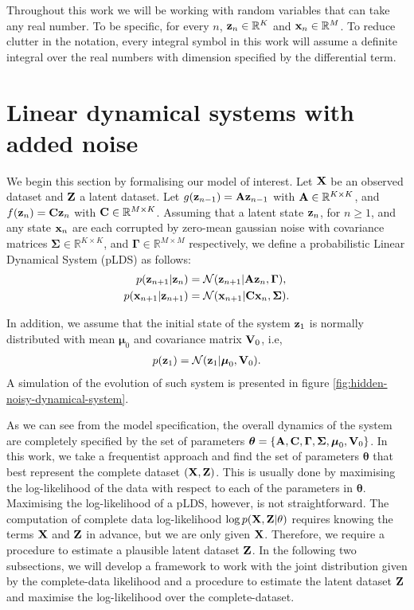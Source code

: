 \documentclass[11pt]{article}
\numberwithin{equation}{section}
\newcommand{\x}{{\bf x}}
\newcommand{\X}{{\bf X}}
\newcommand{\z}{{\bf z}}
\newcommand{\Z}{{\bf Z}}
\newcommand{\N}{\mathcal{N}}
\newcommand{\R}{\mathbb{R}}
\begin{document}
Throughout this work we will be working with random variables that can take any real number. To be specific, for every $n$, $\z_n \in \R^K$ and $\x_n \in \R^M$. To reduce clutter in the notation, every integral  symbol in this work will assume a definite integral over the real numbers with dimension specified by the differential term.

\section{Linear dynamical systems with added noise}
We begin this section by formalising our model of interest. Let $\X$ be an observed dataset and $\Z$ a latent dataset. Let $g(\z_{n-1}) = {\bf A} \z_{n-1}$ with ${\bf A}\in\R^{K\times K}$, and $f(\z_n) = {\bf C} \z_{n}$ with ${\bf C} \in \R^{M \times K}$. Assuming that a latent state $\z_n$, for $n \geq 1$, and any state $\x_n$ are each corrupted by zero-mean gaussian noise with covariance matrices $\boldsymbol{\Sigma} \in \mathbb{R}^{K \times K}$, and $\boldsymbol{\Gamma} \in \mathbb{R}^{M \times M}$ respectively, we define a  probabilistic Linear Dynamical System (pLDS) as follows:
\begin{align}
	p(\z_{n+1} \vert \z_n) &= \N(\z_{n+1} \vert {\bf A}\z_n, \boldsymbol\Gamma),\\
	p(\x_{n+1} \vert \z_{n+1}) &= \N(\x_{n+1} \vert {\bf C}\x_n, \boldsymbol\Sigma).
\end{align}

In addition, we assume that the initial state of the system $\z_1$ is normally distributed with mean $\boldsymbol{\mu}_0$ and covariance matrix ${\bf V}_0$, i.e,
\begin{align}
	p(\z_1) &= \N(\z_1 \vert \boldsymbol\mu_0, {\bf V}_0).\\
\end{align}
A simulation of the evolution of such system is presented in figure \ref{fig:hidden-noisy-dynamical-system}.

As we can see from the model specification, the overall dynamics of the system are completely specified by the set of parameters $\boldsymbol\theta = \{{\bf A}, {\bf C}, \boldsymbol\Gamma, \boldsymbol\Sigma, \boldsymbol\mu_0, {\bf V}_0\}$. In this work, we take a frequentist approach and find the set of parameters $\boldsymbol\theta$ that best represent the complete dataset $(\X, \Z)$. This is usually done by maximising the log-likelihood of the data with respect to each of the parameters in $\boldsymbol{\theta}$. Maximising the log-likelihood of a pLDS, however, is not straightforward. The computation of complete data log-likelihood $\log p(\X, \Z \vert \theta)$ requires knowing the terms $\X$ and $\Z$ in advance, but we are only given $\X$. Therefore, we require a procedure to estimate a plausible latent dataset $\Z$. In the following two subsections, we will develop a framework to work with the joint distribution given by the complete-data likelihood and a procedure to estimate the latent dataset $\Z$ and maximise the log-likelihood over the complete-dataset.
\end{document}
